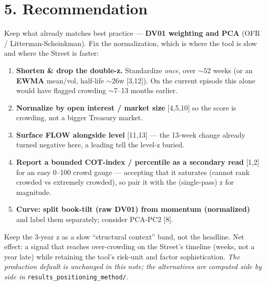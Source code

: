 \documentclass[10pt,a4paper]{article}
\newcommand{\sect}[1]{\section*{\color{bigorange}#1}}
\newcommand{\code}[1]{\texttt{\small #1}}
\newcommand{\rf}[1]{{\footnotesize[#1]}}
\begin{document}
\sect{5. Recommendation}
Keep what already matches best practice --- \textbf{DV01 weighting and PCA} (OFR / Litterman-Scheinkman).
Fix the normalization, which is where the tool is slow and where the Street is faster:
\begin{enumerate}[leftmargin=1.4em,itemsep=1pt]
\item \textbf{Shorten \& drop the double-z.} Standardize \emph{once}, over $\sim$52 weeks (or an
\textbf{EWMA} mean/vol, half-life $\sim$26w \rf{3,12}). On the current episode this alone would have
flagged crowding $\sim$7--13 months earlier.
\item \textbf{Normalize by open interest / market size} \rf{4,5,10} so the score is crowding, not a
bigger Treasury market.
\item \textbf{Surface FLOW alongside level} \rf{11,13} --- the 13-week change already turned negative
here, a leading tell the level-z buried.
\item \textbf{Report a bounded COT-index / percentile as a secondary read} \rf{1,2} for an easy
0--100 crowd gauge --- accepting that it saturates (cannot rank crowded vs extremely crowded), so pair it
with the (single-pass) z for magnitude.
\item \textbf{Curve: split book-tilt (raw DV01) from momentum (normalized)} and label them separately;
consider PCA-PC2 \rf{8}.
\end{enumerate}
Keep the 3-year z as a slow ``structural context'' band, not the headline. Net effect: a signal that
reaches over-crowding on the Street's timeline (weeks, not a year late) while retaining the tool's
risk-unit and factor sophistication. \emph{The production default is unchanged in this note; the
alternatives are computed side by side in} \code{results\_positioning\_method/}.
\end{document}

